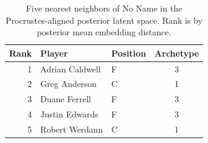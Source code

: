 \begin{table}[htbp]
  \centering\small
  \begin{tabular}{rllc}
    \toprule
    Rank & Player & Position & Archetype \\
    \midrule
    1 & Adrian Caldwell & F & 3 \\
    2 & Greg Anderson & C & 1 \\
    3 & Duane Ferrell & F & 3 \\
    4 & Justin Edwards & F & 3 \\
    5 & Robert Werdann & C & 1 \\
    \bottomrule
  \end{tabular}
  \caption{Five nearest neighbors of No Name in the Procrustes-aligned posterior latent space. Rank is by posterior mean embedding distance.}
  \label{tab:No_Name_neighbors}
\end{table}

